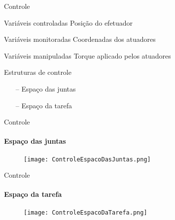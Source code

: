 \documentclass[25pt,landscape]{beamer}
\begin{document}
\begin{frame}{Controle}
    \pause
    \begin{block}{Vari\'aveis controladas}
    	Posi\c{c}\~ao do efetuador
    \end{block}
    \pause
    \begin{block}{Vari\'aveis monitoradas}
    	Coordenadas dos atuadores
    \end{block}
    \pause
    \begin{block}{Vari\'aveis manipuladas}
    	Torque aplicado pelos atuadores
    \end{block}
	\pause
   	\begin{block}{Estruturas de controle}
    	\begin{itemize}
    		\item[--] Espa\c{c}o das juntas
    		\item[--] Espa\c{c}o da tarefa
    	\end{itemize}
    \end{block}
\end{frame}

\begin{frame}{Controle}
    \framesubtitle{Espa\c{c}o das juntas}
    \begin{figure}[!h]
        \centering
        \texttt{[image: ControleEspacoDasJuntas.png]}
    \end{figure}  
\end{frame}

\begin{frame}{Controle}
    \framesubtitle{Espa\c{c}o da tarefa}
    \begin{figure}[!h]
        \centering
        \texttt{[image: ControleEspacoDaTarefa.png]}
    \end{figure}  
\end{frame}
\end{document}
